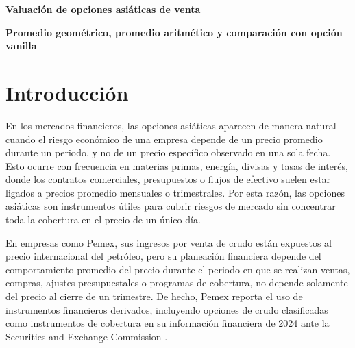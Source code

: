\documentclass[11pt,letterpaper]{article}
\begin{document}
\begin{center}
{\Large\bfseries Valuación de opciones asiáticas de venta}\par
\vspace{0.25em}
{\large\bfseries Promedio geométrico, promedio aritmético y comparación con opción vanilla}
\end{center}

\begin{abstract}
Se desarrolla un caso de estudio para valuar una opción de venta asiática de promedio geométrico con vencimiento de tres meses y compararla con una put asiática de promedio aritmético y una put europea vanilla. La valuación se realiza bajo un modelo lognormal con costo de acarreo constante. Para el promedio geométrico se emplea la fórmula cerrada de \citet{kemna1990}; para el promedio aritmético se utiliza la aproximación de \citet{turnbull1991}, en la versión presentada por \citet{hull2018}, basada en igualación de los dos primeros momentos. Con los parámetros considerados, las primas son: \(P_{\mathrm{arit}}=4.6415\), \(P_{\mathrm{geom}}=4.6922\) y \(P_{\mathrm{vanilla}}=5.2186\). Por tanto,
\[
P_{\mathrm{arit}}<P_{\mathrm{geom}}<P_{\mathrm{vanilla}}.
\]
\end{abstract}


\section{Introducción}
En los mercados financieros, las opciones asiáticas aparecen de manera natural cuando el riesgo económico de una empresa depende de un precio promedio durante un periodo, y no de un precio específico observado en una sola fecha. Esto ocurre con frecuencia en materias primas, energía, divisas y tasas de interés, donde los contratos comerciales, presupuestos o flujos de efectivo suelen estar ligados a precios promedio mensuales o trimestrales. Por esta razón, las opciones asiáticas son instrumentos útiles para cubrir riesgos de mercado sin concentrar toda la cobertura en el precio de un único día.

En empresas como Pemex, sus ingresos por venta de crudo están expuestos al precio internacional del petróleo, pero su planeación financiera depende del comportamiento promedio del precio durante el periodo en que se realizan ventas, compras, ajustes presupuestales o programas de cobertura, no depende solamente del precio al cierre de un trimestre. De hecho, Pemex reporta el uso de instrumentos financieros derivados, incluyendo opciones de crudo clasificadas como instrumentos de cobertura en su información financiera de 2024 ante la Securities and Exchange Commission \citep{pemex2024sec}.
\end{document}
